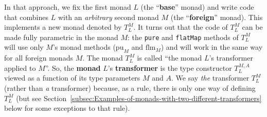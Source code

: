 In that approach, we fix the first monad $L$ (the \textsf{``}\textbf{base}\textsf{''}
monad) and write code that combines $L$ with an \emph{arbitrary}
second monad $M$ (the \textsf{``}\textbf{foreign}\textsf{''} monad). This implements
a new monad denoted by $T_{L}^{M}$. It turns out that the code of
$T_{L}^{M}$ can be made fully parametric in the monad $M$: the \lstinline!pure!
and \lstinline!flatMap! methods of $T_{L}^{M}$ will use only $M$\textsf{'}s
monad methods ($\text{pu}_{M}$ and $\text{flm}_{M}$) and will work
in the same way for all foreign monads $M$. The monad $T_{L}^{M}$
is called \textsf{``}the monad $L$\textsf{'}s transformer applied to $M$\textsf{''}. So,
the \textbf{monad} $L$\textsf{'}s\textbf{ transformer} is
the type constructor $T_{L}^{M,A}$ viewed as a function of its type
parameters $M$ and $A$. We say \emph{the} transformer $T_{L}^{M}$
(rather than \emph{a} transformer) because, as a rule, there is only
one way of defining $T_{L}^{M}$ (but see Section~\ref{subsec:Examples-of-monads-with-two-different-transformers}
below for some exceptions to that rule).

